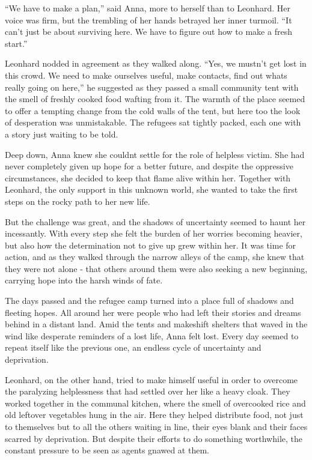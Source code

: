 \documentclass[
]{article}
\begin{document}
``We have to make a plan,'' said Anna, more to herself than to Leonhard.
Her voice was firm, but the trembling of her hands betrayed her inner
turmoil. ``It can't just be about surviving here. We have to figure out
how to make a fresh start.''

Leonhard nodded in agreement as they walked along. ``Yes, we mustn't get
lost in this crowd. We need to make ourselves useful, make contacts,
find out what\textquotesingle s really going on here,'' he suggested as
they passed a small community tent with the smell of freshly cooked food
wafting from it. The warmth of the place seemed to offer a tempting
change from the cold walls of the tent, but here too the look of
desperation was unmistakable. The refugees sat tightly packed, each one
with a story just waiting to be told.

Deep down, Anna knew she couldn\textquotesingle t settle for the role of
helpless victim. She had never completely given up hope for a better
future, and despite the oppressive circumstances, she decided to keep
that flame alive within her. Together with Leonhard, the only support in
this unknown world, she wanted to take the first steps on the rocky path
to her new life.

But the challenge was great, and the shadows of uncertainty seemed to
haunt her incessantly. With every step she felt the burden of her
worries becoming heavier, but also how the determination not to give up
grew within her. It was time for action, and as they walked through the
narrow alleys of the camp, she knew that they were not alone - that
others around them were also seeking a new beginning, carrying hope into
the harsh winds of fate.

The days passed and the refugee camp turned into a place full of shadows
and fleeting hopes. All around her were people who had left their
stories and dreams behind in a distant land. Amid the tents and
makeshift shelters that waved in the wind like desperate reminders of a
lost life, Anna felt lost. Every day seemed to repeat itself like the
previous one, an endless cycle of uncertainty and deprivation.

Leonhard, on the other hand, tried to make himself useful in order to
overcome the paralyzing helplessness that had settled over her like a
heavy cloak. They worked together in the communal kitchen, where the
smell of overcooked rice and old leftover vegetables hung in the air.
Here they helped distribute food, not just to themselves but to all the
others waiting in line, their eyes blank and their faces scarred by
deprivation. But despite their efforts to do something worthwhile, the
constant pressure to be seen as agents gnawed at them.
\end{document}
